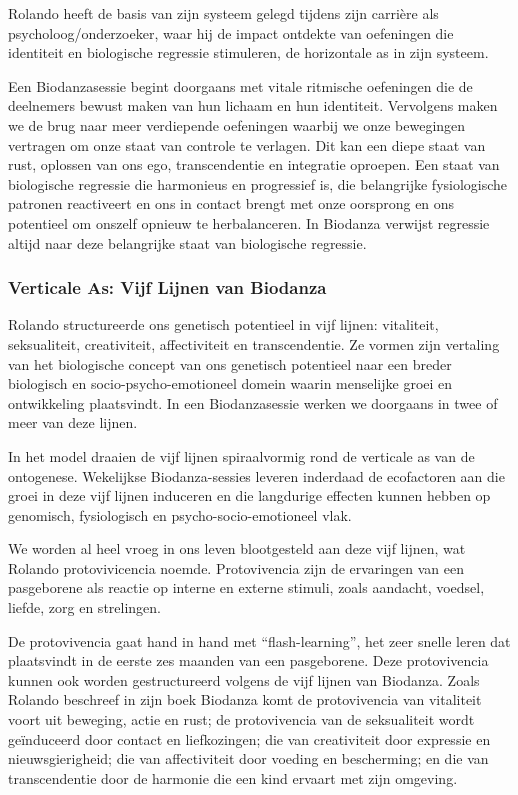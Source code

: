 \documentclass[
  11pt,
]{book}
\begin{document}
Rolando heeft de basis van zijn systeem gelegd tijdens zijn carrière als psycholoog/onderzoeker, waar hij de impact ontdekte van oefeningen die identiteit en biologische regressie stimuleren, de horizontale as in zijn systeem.

Een Biodanzasessie begint doorgaans met vitale ritmische oefeningen die de deelnemers bewust maken van hun lichaam en hun identiteit. Vervolgens maken we de brug naar meer verdiepende oefeningen waarbij we onze bewegingen vertragen om onze staat van controle te verlagen. Dit kan een diepe staat van rust, oplossen van ons ego, transcendentie en integratie oproepen. Een staat van biologische regressie die harmonieus en progressief is, die belangrijke fysiologische patronen reactiveert en ons in contact brengt met onze oorsprong en ons potentieel om onszelf opnieuw te herbalanceren. In Biodanza verwijst regressie altijd naar deze belangrijke staat van biologische regressie.

\hypertarget{verticale-as-vijf-lijnen-van-biodanza}{%
\subsubsection{Verticale As: Vijf Lijnen van Biodanza}\label{verticale-as-vijf-lijnen-van-biodanza}}

Rolando structureerde ons genetisch potentieel in vijf lijnen: vitaliteit, seksualiteit, creativiteit, affectiviteit en transcendentie. Ze vormen zijn vertaling van het biologische concept van ons genetisch potentieel naar een breder biologisch en socio-psycho-emotioneel domein waarin menselijke groei en ontwikkeling plaatsvindt. In een Biodanzasessie werken we doorgaans in twee of meer van deze lijnen.

In het model draaien de vijf lijnen spiraalvormig rond de verticale as van de ontogenese. Wekelijkse Biodanza-sessies leveren inderdaad de ecofactoren aan die groei in deze vijf lijnen induceren en die langdurige effecten kunnen hebben op genomisch, fysiologisch en psycho-socio-emotioneel vlak.

We worden al heel vroeg in ons leven blootgesteld aan deze vijf lijnen, wat Rolando protovivicencia noemde. Protovivencia zijn de ervaringen van een pasgeborene als reactie op interne en externe stimuli, zoals aandacht, voedsel, liefde, zorg en strelingen.

De protovivencia gaat hand in hand met ``flash-learning'', het zeer snelle leren dat plaatsvindt in de eerste zes maanden van een pasgeborene. Deze protovivencia kunnen ook worden gestructureerd volgens de vijf lijnen van Biodanza. Zoals Rolando beschreef in zijn boek Biodanza \citep{toro2008} komt de protovivencia van vitaliteit voort uit beweging, actie en rust; de protovivencia van de seksualiteit wordt geïnduceerd door contact en liefkozingen; die van creativiteit door expressie en nieuwsgierigheid; die van affectiviteit door voeding en bescherming; en die van transcendentie door de harmonie die een kind ervaart met zijn omgeving.
\end{document}
